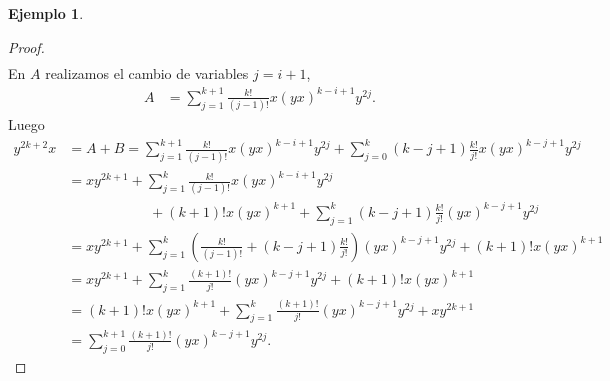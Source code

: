 \documentclass[a4paper,oneside,fleqn,11pt]{report}
\theoremstyle{definition}
\theoremstyle{definition}
\newtheorem{example}{Ejemplo}[section]
\numberwithin{prop}{subsection}
\begin{document}
\begin{example}
\begin{proof}
\begin{align*}
\end{align*}
En $A$ realizamos el cambio de variables $j = i + 1$,
\begin{align*}
	A &= \sum_{j = 1}^{k + 1} \frac{k!}{(j-1)!} x(yx)^{k - i + 1}y^{2j}.
\end{align*}
Luego
\begin{align*}
	y^{2k + 2}x &= A + B = \sum_{j = 1}^{k + 1} \frac{k!}{(j-1)!} x(yx)^{k - i + 1}y^{2j}
		+ \sum_{j = 0}^k (k - j + 1)\frac{k!}{j!} x(yx)^{k - j + 1}y^{2j} \\
	&= xy^{2k + 1} + \sum_{j = 1}^{k} \frac{k!}{(j-1)!} x(yx)^{k - i + 1}y^{2j} \\
		&\hspace{70pt}+ (k+1)!x(yx)^{k + 1} + \sum_{j = 1}^k (k - j + 1)\frac{k!}{j!} (yx)^{k - j + 1}y^{2j} \\
	&= xy^{2k + 1} + \sum_{j = 1}^k \left( \frac{k!}{(j-1)!} + (k - j + 1)\frac{k!}{j!} \right) (yx)^{k - j + 1}y^{2j} 
		+ (k+1)!x(yx)^{k + 1} \\
	&= xy^{2k + 1} +\sum_{j = 1}^k \frac{(k + 1)!}{j!} (yx)^{k - j + 1}y^{2j} + (k+1)!x(yx)^{k + 1} \\
	&= (k+1)!x(yx)^{k + 1} + \sum_{j = 1}^k \frac{(k + 1)!}{j!} (yx)^{k - j + 1}y^{2j} + xy^{2k + 1} \\
	&= \sum_{j = 0}^{k + 1} \frac{(k + 1)!}{j!} (yx)^{k - j + 1}y^{2j}.
\end{align*}
\end{proof}

\end{example}
\end{document}

